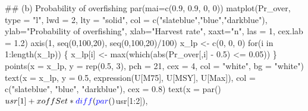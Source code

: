 \documentclass[
  11pt,
]{article}
\newenvironment{Shaded}{}{}
\newcommand{\CommentTok}[1]{\textcolor[rgb]{0.00,0.50,0.00}{#1}}
\newcommand{\ControlFlowTok}[1]{\textcolor[rgb]{0.00,0.00,1.00}{#1}}
\newcommand{\DataTypeTok}[1]{#1}
\newcommand{\DecValTok}[1]{#1}
\newcommand{\FloatTok}[1]{#1}
\newcommand{\KeywordTok}[1]{\textcolor[rgb]{0.00,0.00,1.00}{#1}}
\newcommand{\NormalTok}[1]{#1}
\newcommand{\OperatorTok}[1]{#1}
\newcommand{\StringTok}[1]{\textcolor[rgb]{0.00,0.50,0.50}{#1}}
\begin{document}
\begin{Shaded}
\begin{Highlighting}[]
{{\CommentTok{## (b) Probability of overfishing}
\KeywordTok{par}\NormalTok{(}\DataTypeTok{mai=}\KeywordTok{c}\NormalTok{(}\FloatTok{0.9}\NormalTok{, }\FloatTok{0.9}\NormalTok{, }\DecValTok{0}\NormalTok{, }\DecValTok{0}\NormalTok{))}
\KeywordTok{matplot}\NormalTok{(Pr_over, }\DataTypeTok{type =} \StringTok{"l"}\NormalTok{, }\DataTypeTok{lwd =} \DecValTok{2}\NormalTok{, }\DataTypeTok{lty =} \StringTok{"solid"}\NormalTok{,}
        \DataTypeTok{col =} \KeywordTok{c}\NormalTok{(}\StringTok{"slateblue"}\NormalTok{,}\StringTok{"blue"}\NormalTok{,}\StringTok{"darkblue"}\NormalTok{), }
        \DataTypeTok{ylab=}\StringTok{"Probability of overfishing"}\NormalTok{, }
        \DataTypeTok{xlab=}\StringTok{"Harvest rate"}\NormalTok{, }\DataTypeTok{xaxt=}\StringTok{"n"}\NormalTok{,}
        \DataTypeTok{las =} \DecValTok{1}\NormalTok{, }\DataTypeTok{cex.lab =} \FloatTok{1.2}\NormalTok{)}
\KeywordTok{axis}\NormalTok{(}\DecValTok{1}\NormalTok{, }\KeywordTok{seq}\NormalTok{(}\DecValTok{0}\NormalTok{,}\DecValTok{100}\NormalTok{,}\DecValTok{20}\NormalTok{), }\KeywordTok{seq}\NormalTok{(}\DecValTok{0}\NormalTok{,}\DecValTok{100}\NormalTok{,}\DecValTok{20}\NormalTok{)}\OperatorTok{/}\DecValTok{100}\NormalTok{)}
\NormalTok{x_lp <-}\StringTok{ }\KeywordTok{c}\NormalTok{(}\DecValTok{0}\NormalTok{, }\DecValTok{0}\NormalTok{, }\DecValTok{0}\NormalTok{)}
\ControlFlowTok{for}\NormalTok{(i }\ControlFlowTok{in} \DecValTok{1}\OperatorTok{:}\KeywordTok{length}\NormalTok{(x_lp)) \{}
\NormalTok{  x_lp[i] <-}\StringTok{ }\KeywordTok{max}\NormalTok{(}\KeywordTok{which}\NormalTok{(}\KeywordTok{abs}\NormalTok{(Pr_over[,i] }\OperatorTok{-}\StringTok{ }\FloatTok{0.5}\NormalTok{) }\OperatorTok{<=}\StringTok{ }\FloatTok{0.05}\NormalTok{))}
\NormalTok{\}}
\KeywordTok{points}\NormalTok{(}\DataTypeTok{x =}\NormalTok{ x_lp, }\DataTypeTok{y =} \KeywordTok{rep}\NormalTok{(}\FloatTok{0.5}\NormalTok{, }\DecValTok{3}\NormalTok{), }\DataTypeTok{pch =} \DecValTok{21}\NormalTok{, }\DataTypeTok{cex =} \DecValTok{4}\NormalTok{,}
       \DataTypeTok{col =} \StringTok{"white"}\NormalTok{, }\DataTypeTok{bg =} \StringTok{"white"}\NormalTok{)}
\KeywordTok{text}\NormalTok{(}\DataTypeTok{x =}\NormalTok{ x_lp, }\DataTypeTok{y =} \FloatTok{0.5}\NormalTok{, }\KeywordTok{expression}\NormalTok{(U[M75], U[MSY], U[Max]),}
     \DataTypeTok{col =} \KeywordTok{c}\NormalTok{(}\StringTok{"slateblue"}\NormalTok{, }\StringTok{"blue"}\NormalTok{, }\StringTok{"darkblue"}\NormalTok{), }\DataTypeTok{cex =} \FloatTok{0.8}\NormalTok{)}
\KeywordTok{text}\NormalTok{(}\DataTypeTok{x =} \KeywordTok{par}\NormalTok{()}\OperatorTok{$}\NormalTok{usr[}\DecValTok{1}\NormalTok{] }\OperatorTok{+}\StringTok{ }\NormalTok{xoffSet }\OperatorTok{*}\StringTok{ }\KeywordTok{diff}\NormalTok{(}\KeywordTok{par}\NormalTok{()}\OperatorTok{$}\NormalTok{usr[}\DecValTok{1}\OperatorTok{:}\DecValTok{2}\NormalTok{]),}
}}
\end{Highlighting}
\end{Shaded}
\end{document}

